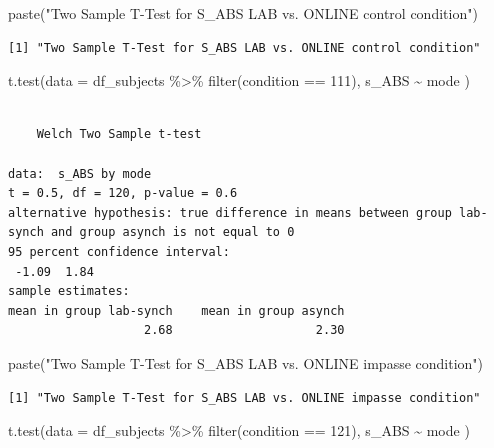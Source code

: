 \documentclass[
  letterpaper,
  DIV=11,
  numbers=noendperiod]{scrreprt}
\newenvironment{Shaded}{\begin{snugshade}}{\end{snugshade}}
\newcommand{\AttributeTok}[1]{\textcolor[rgb]{0.40,0.45,0.13}{#1}}
\newcommand{\DecValTok}[1]{\textcolor[rgb]{0.68,0.00,0.00}{#1}}
\newcommand{\FunctionTok}[1]{\textcolor[rgb]{0.28,0.35,0.67}{#1}}
\newcommand{\NormalTok}[1]{\textcolor[rgb]{0.00,0.23,0.31}{#1}}
\newcommand{\SpecialCharTok}[1]{\textcolor[rgb]{0.37,0.37,0.37}{#1}}
\newcommand{\StringTok}[1]{\textcolor[rgb]{0.13,0.47,0.30}{#1}}
\begin{document}
\begin{Shaded}
\begin{Highlighting}[]
\FunctionTok{paste}\NormalTok{(}\StringTok{"Two Sample T{-}Test for S\_ABS LAB vs. ONLINE control condition"}\NormalTok{)}
\end{Highlighting}
\end{Shaded}

\begin{verbatim}
[1] "Two Sample T-Test for S_ABS LAB vs. ONLINE control condition"
\end{verbatim}

\begin{Shaded}
\begin{Highlighting}[]
\FunctionTok{t.test}\NormalTok{(}\AttributeTok{data =}\NormalTok{ df\_subjects }\SpecialCharTok{\%\textgreater{}\%} \FunctionTok{filter}\NormalTok{(condition }\SpecialCharTok{==} \DecValTok{111}\NormalTok{), s\_ABS }\SpecialCharTok{\textasciitilde{}}\NormalTok{ mode )}
\end{Highlighting}
\end{Shaded}

\begin{verbatim}

    Welch Two Sample t-test

data:  s_ABS by mode
t = 0.5, df = 120, p-value = 0.6
alternative hypothesis: true difference in means between group lab-synch and group asynch is not equal to 0
95 percent confidence interval:
 -1.09  1.84
sample estimates:
mean in group lab-synch    mean in group asynch 
                   2.68                    2.30 
\end{verbatim}

\begin{Shaded}
\begin{Highlighting}[]
\FunctionTok{paste}\NormalTok{(}\StringTok{"Two Sample T{-}Test for S\_ABS LAB vs. ONLINE impasse condition"}\NormalTok{)}
\end{Highlighting}
\end{Shaded}

\begin{verbatim}
[1] "Two Sample T-Test for S_ABS LAB vs. ONLINE impasse condition"
\end{verbatim}

\begin{Shaded}
\begin{Highlighting}[]
\FunctionTok{t.test}\NormalTok{(}\AttributeTok{data =}\NormalTok{ df\_subjects }\SpecialCharTok{\%\textgreater{}\%} \FunctionTok{filter}\NormalTok{(condition }\SpecialCharTok{==} \DecValTok{121}\NormalTok{), s\_ABS }\SpecialCharTok{\textasciitilde{}}\NormalTok{ mode )}
\end{Highlighting}
\end{Shaded}
\end{document}
